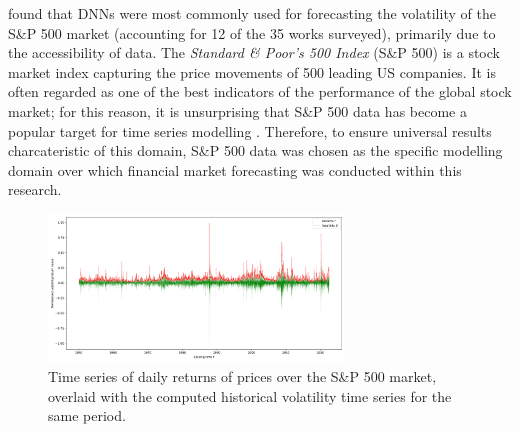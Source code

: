 \documentclass[a4paper, 11pt]{report}
\begin{document}
    \citet{ge-2022} found that DNNs were most commonly used for forecasting the volatility of the S\&P 500 market (accounting for 12 of the 35 works surveyed), primarily due to the accessibility of data. The \emph{Standard \& Poor's 500 Index} (S\&P 500) is a stock market index capturing the price movements of 500 leading US companies. It is often regarded as one of the best indicators of the performance of the global stock market; for this reason, it is unsurprising that S\&P 500 data has become a popular target for time series modelling \citep{thakkar-2021}. Therefore, to ensure universal results charcateristic of this domain, S\&P 500 data was chosen as the specific modelling domain over which financial market forecasting was conducted within this research.

    \begin{figure}[ht]
        \centering
        \includegraphics[width=0.7\textwidth]{volatility.png}
        \caption{\centering Time series of daily returns of prices over the S\&P 500 market, overlaid with the computed historical volatility time series for the same period.}
        \label{fig: ret-vol}
    \end{figure}
\end{document}
